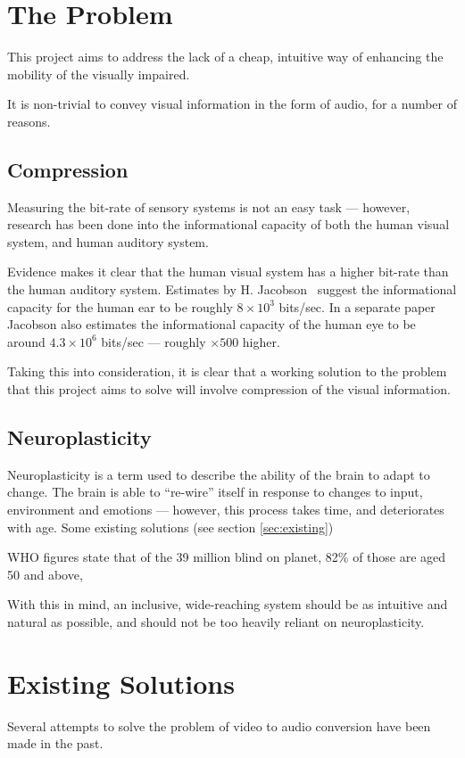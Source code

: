 \section{The Problem}
This project aims to address the lack of a cheap, intuitive way of enhancing the mobility of the visually impaired.

It is non-trivial to convey visual information in the form of audio, for a number of reasons.

\subsection{Compression}
\label{sec:compression}
Measuring the bit-rate of sensory systems is not an easy task --- however, research has been done into the informational capacity of both the human visual system, and human auditory system.

Evidence makes it clear that the human visual system has a higher bit-rate than the human auditory system. Estimates by H. Jacobson~\cite{jacobson1950informational} suggest the informational capacity for the human ear to be roughly $8\times10^3$ bits/sec. In a separate paper~\cite{jacobson1951informational} Jacobson also estimates the informational capacity of the human eye to be around $4.3\times10^6$ bits/sec --- roughly $\times500$ higher. 

Taking this into consideration, it is clear that a working solution to the problem that this project aims to solve will involve compression of the visual information. 

\subsection{Neuroplasticity}
Neuroplasticity is a term used to describe the ability of the brain to adapt to change. The brain is able to ``re-wire'' itself in response to changes to input, environment and emotions --- however, this process takes time, and deteriorates with age\cite{park2013aging}. Some existing solutions (see section \ref{sec:existing})

\ac{WHO} figures state that of the 39 million blind on planet, 82\% of those are aged 50 and above,

With this in mind, an inclusive, wide-reaching system should be as intuitive and natural as possible, and should not be too heavily reliant on neuroplasticity.

\section{Existing Solutions}
\label{sec:exisiting}
Several attempts to solve the problem of video to audio conversion have been made in the past.

